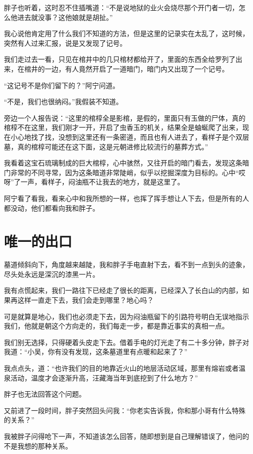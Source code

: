 胖子也听着，这时忍不住插嘴道：“不是说地狱的业火会烧尽那个开门者一切，怎么他进去就没事？这他娘就是胡扯。”

我心说他肯定用了什么我们不知道的方法，但是这里的记录实在太乱了，这时候，突然有人过来汇报，说是又发现了记号。

我们走过去一看，只见在棺井中的几只棺材都给开了，里面的东西全给罗列了出来，在棺井的一边，有人竟然开启了一道暗门，暗门内又出现了一个记号。

“这记号不是你们留下的？”阿宁问道。

“不是，我们也很纳闷。”我假装不知道。

旁边一个人报告说：“这里的棺椁全是影棺，是假的，里面只有玉做的尸体，真的棺椁不在这里，我们刚才一开，开启了虫香玉的机关，结果全是蚰蜒爬了出来，现在小心地找了找，没想到这里还有一条密道，而且也有人进去了，看样子是个双层墓，真的棺椁可能还在这下面，这是元朝进修比较流行的墓葬方式。”

我看着这宝石琉璃制成的巨大棺椁，心中骇然，又往开启的暗门看去，发现这条暗门非常的不同寻常，因为这条暗道非常陡峭，似乎以挖掘深度为目标的。心中“哎呀”了一声，看样子，闷油瓶不让我去的地方，就是这里了。

阿宁看了看我，看来心中和我所想的一样，也挥了挥手想让人下去，但是所有的人都没动，他们都看向我和胖子。

\chapter{唯一的出口}

墓道倾斜向下，角度越来越陡，我和胖子手电直射下去，看不到一点到头的迹象，尽头处永远是深沉的漆黑一片。

我有点慌起来，我们一路往下已经走了很长的距离，已经深入了长白山的内部，如果再这样一直走下去，我们会走到哪里？地心吗？

可是就算是地心，我们也必须走下去，因为闷油瓶留下的引路符号明白无误地指示我们，他就是朝这个方向走的，我们每走一步，都是靠近事实的真相一点。

我们别无选择，只得硬着头皮走下去。借着手电的灯光走了有二十多分钟，胖子对我道：“小吴，你有没有发现，这条墓道里有点暖和起来了？”

我点点头，道：“也许我们的目的地靠近火山的地层活动区域，那里有熔岩或者温泉活动，温度才会逐渐升高，汪藏海当年到底挖到了什么地方？”

胖子也无法回答这个问题。

又前进了一段时间，胖子突然回头问我：“你老实告诉我，你和那小哥有什么特殊的关系？”

我被胖子问得呛下一声，不知道该怎么回答，随即想到是自己理解错误了，他问的不是我想的那种关系。


